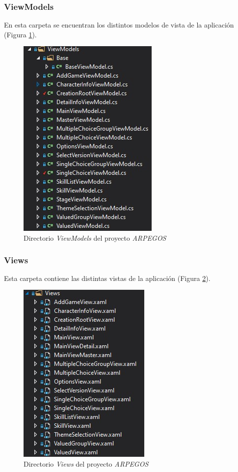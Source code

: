 {\subsubsection{ViewModels}
En esta carpeta se encuentran los distintos modelos de vista 
de la aplicación (Figura \ref*{ViewModels}).
\begin{figure}[H]
    \centering
    \includegraphics[scale=1]{Images/ARPEGOS_ViewModels.jpg}
    \caption{Directorio \textit{ViewModels} del proyecto \textit{ARPEGOS}}
    \label{ViewModels}    
\end{figure}

\subsubsection{Views}
Esta carpeta contiene las distintas vistas de la aplicación (Figura \ref*{Views}).

\begin{figure}[H]
    \centering
    \includegraphics[scale=1]{Images/ARPEGOS_Views.jpg}
    \caption{Directorio \textit{Views} del proyecto \textit{ARPEGOS}}
    \label{Views}    
\end{figure}

}

